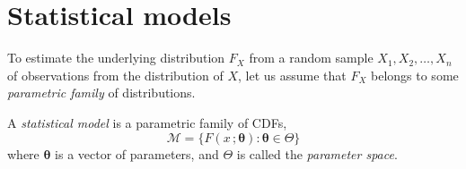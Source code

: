 
\section{Statistical models}\label{sec:statistical_models}

%
%
%
%


To estimate the underlying distribution $F_X$ from a random sample $X_1,X_2,\ldots,X_n$ of observations from the distribution of $X$, let us assume that $F_X$ belongs to some \emph{parametric family} of distributions.
%
\begin{definition}
A \emph{statistical model} is a parametric family of CDFs,
\[
\mathcal{M} = \big\{F(x\,;\mathbf{\theta}) : \mathbf{\theta}\in\Theta\big\}
\]
where $\mathbf{\theta}$ is a vector of parameters, and $\Theta$ is called the \emph{parameter space}.
\end{definition}

